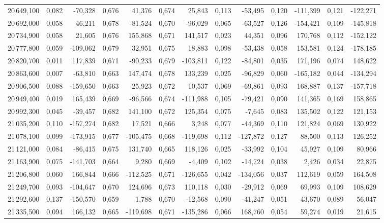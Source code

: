 \begin{longtable}{rrrrrrrrrrrrr}
20\,649,100 & 0,082 & -70,328 & 0,676 & 41,376 & 0,674 & 25,843 & 0,113 & -53,495 & 0,120 & -111,399 & 0,121 & -122,271\\
20\,692,000 & 0,058 & 46,211 & 0,678 & -81,524 & 0,670 & -96,029 & 0,065 & -63,527 & 0,126 & -154,421 & 0,109 & -145,818\\
20\,734,900 & 0,058 & 21,605 & 0,676 & 155,868 & 0,671 & 141,517 & 0,023 & 44,351 & 0,096 & 170,768 & 0,112 & -152,122\\
20\,777,800 & 0,059 & -109,062 & 0,679 & 32,951 & 0,675 & 18,883 & 0,098 & -53,438 & 0,058 & 153,581 & 0,124 & -178,185\\
20\,820,700 & 0,011 & 117,839 & 0,671 & -90,233 & 0,679 & -103,811 & 0,122 & -84,801 & 0,035 & 171,196 & 0,074 & 148,622\\
20\,863,600 & 0,007 & -63,810 & 0,663 & 147,474 & 0,678 & 133,239 & 0,025 & -96,829 & 0,060 & -165,182 & 0,044 & -134,294\\
20\,906,500 & 0,088 & -159,650 & 0,663 & 25,923 & 0,672 & 10,537 & 0,069 & -69,861 & 0,093 & 168,887 & 0,137 & -157,718\\
20\,949,400 & 0,019 & 165,439 & 0,669 & -96,566 & 0,674 & -111,988 & 0,105 & -79,421 & 0,090 & 141,365 & 0,169 & 158,865\\
20\,992,300 & 0,045 & -39,457 & 0,682 & 141,100 & 0,672 & 125,354 & 0,075 & -7,645 & 0,083 & 135,502 & 0,122 & 121,153\\
21\,035,200 & 0,110 & -157,274 & 0,682 & 17,521 & 0,666 & 3,248 & 0,077 & -44,369 & 0,110 & 121,824 & 0,069 & 130,922\\
21\,078,100 & 0,099 & -173,915 & 0,677 & -105,475 & 0,668 & -119,698 & 0,112 & -127,872 & 0,127 & 88,500 & 0,113 & 126,252\\
21\,121,000 & 0,084 & -86,415 & 0,675 & 131,740 & 0,665 & 118,126 & 0,025 & -33,992 & 0,104 & 45,927 & 0,109 & 80,966\\
21\,163,900 & 0,075 & -141,703 & 0,664 & 9,280 & 0,669 & -4,409 & 0,102 & -14,724 & 0,038 & 2,426 & 0,034 & 22,875\\
21\,206,800 & 0,060 & 166,844 & 0,666 & -112,525 & 0,671 & -126,655 & 0,042 & -134,056 & 0,037 & 112,619 & 0,059 & 164,508\\
21\,249,700 & 0,093 & -104,647 & 0,670 & 124,696 & 0,673 & 110,118 & 0,030 & -29,912 & 0,069 & 69,993 & 0,109 & 108,629\\
21\,292,600 & 0,137 & -150,570 & 0,659 & 1,788 & 0,670 & -12,568 & 0,090 & -41,247 & 0,051 & 43,670 & 0,089 & 56,047\\
21\,335,500 & 0,094 & 166,132 & 0,665 & -119,698 & 0,671 & -135,286 & 0,066 & 168,760 & 0,054 & 59,274 & 0,019 & 21,615\\

\end{longtable}
